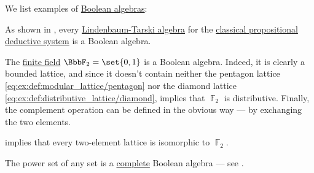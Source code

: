 \begin{example}\label{ex:def:boolean_algebra}
  We list examples of \hyperref[def:boolean_algebra]{Boolean algebras}:

  \begin{thmenum}
     As shown in , every \hyperref[def:lindenbaum_tarski_algebra]{Lindenbaum-Tarski algebra} for the \hyperref[def:classical_propositional_deductive_systems]{classical propositional deductive system} is a Boolean algebra.

     The \hyperref[def:finite_field]{finite field} \( \BbbF_2 = \set{ 0, 1 } \) is a Boolean algebra. Indeed, it is clearly a bounded lattice, and since it doesn't contain neither the pentagon lattice \eqref{eq:ex:def:modular_lattice/pentagon} nor the diamond lattice \eqref{eq:ex:def:distributive_lattice/diamond},  implies that \( \BbbF_2 \) is distributive. Finally, the complement operation can be defined in the obvious way --- by exchanging the two elements.

     implies that every two-element lattice is isomorphic to \( \BbbF_2 \).

     The power set of any set is a \hyperref[def:complete_lattice]{complete} Boolean algebra --- see .
  \end{thmenum}
\end{example}

